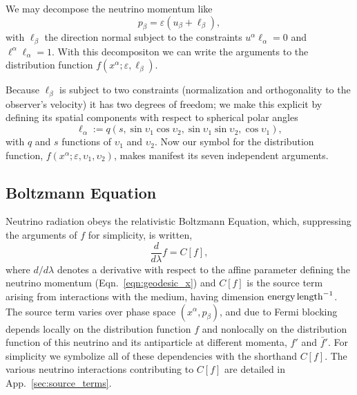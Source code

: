 \documentclass[aps,floatfix,prd,superscriptaddress,twocolumn]{revtex4-1}
\newcommand{\todo}[1]{\marginpar{\tiny{\textcolor{red}{#1}}}}
\begin{document}
We may decompose the neutrino momentum like
\begin{equation}
  \label{eqn:def_momentum}
  p_\beta = \varepsilon (u_\beta + \ell_\beta),
\end{equation}
with $\ell_\beta$ the direction normal subject to the constraints
$u^\alpha \ell_\alpha = 0$ and $\ell^\alpha \ell_\alpha=1$.
With this decompositon we can write the arguments to the distribution function
$f(x^\alpha;\varepsilon,\ell_\beta)$.

Because $\ell_\beta$ is subject to two constraints
(normalization and orthogonality to the observer's velocity)
it has two degrees of freedom; we make this explicit by defining its
spatial components with respect to spherical polar angles
\begin{equation}
  \label{eqn:def_direction}
  \ell_\alpha :=
  q (s,\sin\upsilon_1\cos\upsilon_2,\sin\upsilon_1\sin\upsilon_2,\cos\upsilon_1),
\end{equation}
with $q$ and $s$ functions of $\upsilon_1$ and $\upsilon_2$.
Now our symbol for the distribution function,
$f(x^\alpha;\varepsilon,\upsilon_1,\upsilon_2)$,
makes manifest its seven independent arguments.
\todo{also decompose wrt $p_t$}

\subsection{Boltzmann Equation}
\label{ssec:boltzmann}
Neutrino radiation obeys the relativistic Boltzmann Equation,
which, suppressing the arguments of $f$ for simplicity, is written,
\todo{point out limit of QKEs}
\begin{equation}
  \label{eqn:boltzmann}
  \frac{d}{d\lambda}f = C[f],
\end{equation}
where $d/d\lambda$ denotes a derivative with respect to the affine
parameter defining the neutrino momentum (Eqn.~\ref{eqn:geodesic_x})
and $C[f]$ is the source term arising from interactions with the medium,
having dimension ${\rm energy}\,{\rm length}^{-1}$.
\todo{describe $C[f]$ in physical terms}
The source term varies over phase space $(x^\alpha,p_\beta)$,
and due to Fermi blocking depends locally on the distribution function $f$
and nonlocally on the distribution function of this neutrino and its
antiparticle at different momenta, $f'$ and $\bar{f}'$.
For simplicity we symbolize all of these dependencies with the shorthand $C[f]$.
The various neutrino interactions contributing to $C[f]$ are detailed in
App.~\ref{sec:source_terms}.
\end{document}
